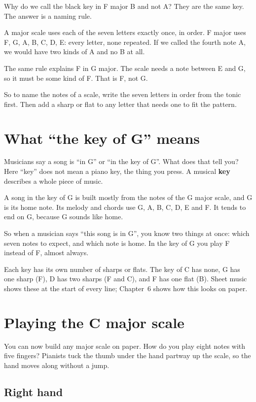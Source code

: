 Why do we call the black key in F major B\fl{} and not A\sh? They are the same key. The answer is a naming rule.

A major scale uses each of the seven letters exactly once, in order. F major uses F, G, A, B, C, D, E: every letter, none repeated. If we called the fourth note A\sh, we would have two kinds of A and no B at all.

The same rule explains F\sh{} in G major. The scale needs a note between E and G, so it must be some kind of F. That is F\sh, not G\fl.

So to name the notes of a scale, write the seven letters in order from the tonic first. Then add a sharp or flat to any letter that needs one to fit the pattern.

\section{What ``the key of G'' means}

Musicians say a song is ``in G'' or ``in the key of G''. What does that tell you? Here ``key'' does not mean a piano key, the thing you press. A musical \textbf{key} describes a whole piece of music.

A song in the key of G is built mostly from the notes of the G major scale, and G is its home note. Its melody and chords use G, A, B, C, D, E and F\sh. It tends to end on G, because G sounds like home.

So when a musician says ``this song is in G'', you know two things at once: which seven notes to expect, and which note is home. In the key of G you play F\sh{} instead of F, almost always.

Each key has its own number of sharps or flats. The key of C has none, G has one sharp (F\sh), D has two sharps (F\sh{} and C\sh), and F has one flat (B\fl). Sheet music shows these at the start of every line; Chapter~6 shows how this looks on paper.

\section{Playing the C major scale}

You can now build any major scale on paper. How do you play eight notes with five fingers? Pianists tuck the thumb under the hand partway up the scale, so the hand moves along without a jump.

\subsection*{Right hand}

